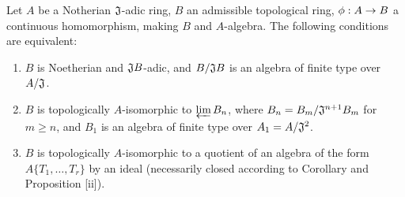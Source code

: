 \begin{prop}[7.5.5]
\label{0.7.5.5}
Let $A$ be a Notherian $\mathfrak{J}$-adic ring, $B$ an admissible topological ring,
$\phi:A\to B$ a continuous homomorphism, making $B$ and $A$-algebra. The following
conditions are equivalent:
\begin{enumerate}[label={\rm(\alph*)}]
  \item $B$ is Noetherian and $\mathfrak{J}B$-adic, and $B/\mathfrak{J}B$ is an
    algebra of finite type over $A/\mathfrak{J}$.
  \item $B$ is topologically $A$-isomorphic to $\varprojlim B_n$, where
    $B_n=B_m/\mathfrak{J}^{n+1}B_m$ for $m\geqslant n$, and $B_1$ is an algebra of finite
    type over $A_1=A/\mathfrak{J}^2$.
  \item $B$ is topologically $A$-isomorphic to a quotient of an algebra of the form
    $A\{T_1,\dots,T_r\}$ by an ideal (necessarily closed according to
    Corollary  and Proposition [ii]).
\end{enumerate}
\end{prop}

